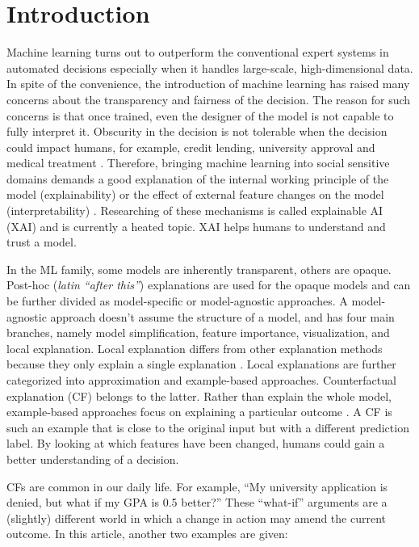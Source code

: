 \section{Introduction}
Machine learning turns out to outperform the conventional expert systems in automated decisions especially when it handles large-scale, high-dimensional data. In spite of the convenience, the introduction of machine learning has raised many concerns about the transparency and fairness of the decision. The reason for such concerns is that once trained, even the designer of the model is not capable to fully interpret it. Obscurity in the decision is not tolerable when the decision could impact humans, for example, credit lending, university approval and medical treatment \cite{CFReview}. Therefore, bringing machine learning into social sensitive domains demands a good explanation of the internal working principle of the model (explainability) or the effect of external feature changes on the model (interpretability) \cite{XAIBook}.
Researching of these mechanisms is called explainable AI (XAI) and is currently a heated topic. XAI helps humans to understand and trust a model.

In the ML family, some models are inherently transparent, others are opaque. Post-hoc (\emph{latin ``after this''}) explanations are used for the opaque models and can be further divided as model-specific or model-agnostic approaches. A model-agnostic approach doesn't assume the structure of a model, and has four main branches, namely model simplification, feature importance, visualization, and local explanation. Local explanation differs from other explanation methods because they only explain a single explanation \cite{CFReview}. Local explanations are further categorized into approximation and example-based approaches. Counterfactual explanation (CF) belongs to the latter. Rather than explain the whole model, example-based approaches focus on explaining a particular outcome \cite{CFReview}. A CF is such an example that is close to the original input but with a different prediction label. By looking at which features have been changed, humans could gain a better understanding of a decision.

CFs are common in our daily life. For example, ``My university application is denied, but what if my GPA is 0.5 better?'' These ``what-if'' arguments are a (slightly) different world in which a change in action may amend the current outcome. In this article, another two examples are given:

